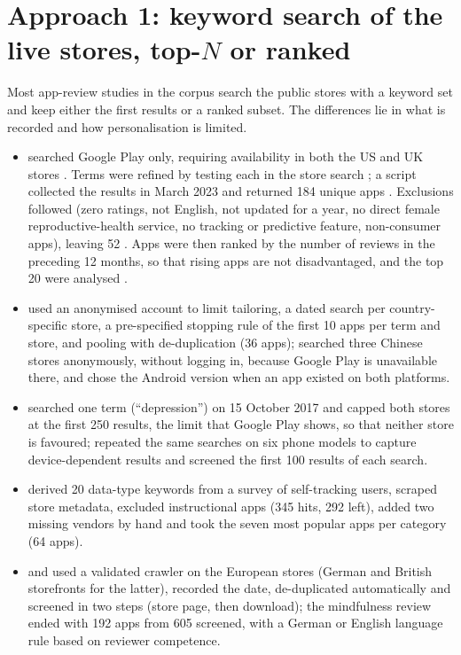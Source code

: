 \section{Approach 1: keyword search of the live stores, top-$N$ or ranked}
Most app-review studies in the corpus search the public stores with a keyword set and keep either the first results or a ranked subset. The differences lie in what is recorded and how personalisation is limited.
\begin{itemize}
\item {} searched Google Play only, requiring availability in both the US and UK stores . Terms were refined by testing each in the store search ; a script collected the results in March 2023 and returned 184 unique apps . Exclusions followed (zero ratings, not English, not updated for a year, no direct female reproductive-health service, no tracking or predictive feature, non-consumer apps), leaving 52 . Apps were then ranked by the number of reviews in the preceding 12 months, so that rising apps are not disadvantaged, and the top 20 were analysed .
\item {} used an anonymised account to limit tailoring, a dated search per country-specific store, a pre-specified stopping rule of the first 10 apps per term and store, and pooling with de-duplication (36 apps);  searched three Chinese stores anonymously, without logging in, because Google Play is unavailable there, and chose the Android version when an app existed on both platforms.
\item {} searched one term (``depression'') on 15 October 2017 and capped both stores at the first 250 results, the limit that Google Play shows, so that neither store is favoured;  repeated the same searches on six phone models to capture device-dependent results and screened the first 100 results of each search.
\item {} derived 20 data-type keywords from a survey of self-tracking users, scraped store metadata, excluded instructional apps (345 hits, 292 left), added two missing vendors by hand and took the seven most popular apps per category (64 apps).
\item {} and  used a validated crawler on the European stores (German and British storefronts for the latter), recorded the date, de-duplicated automatically and screened in two steps (store page, then download); the mindfulness review ended with 192 apps from 605 screened, with a German or English language rule based on reviewer competence.
\end{itemize}

